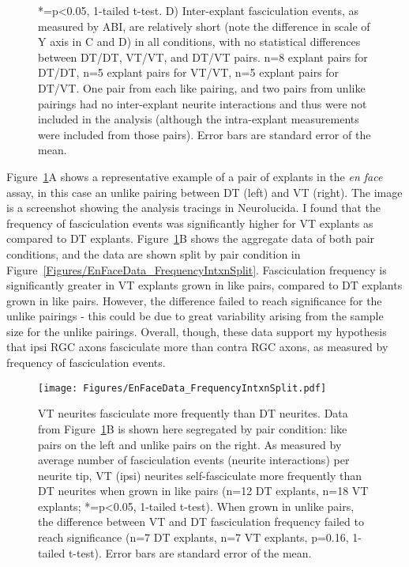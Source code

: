 \begin{figure}[hbtp]
\begin{center}
{        *=p<0.05, 1-tailed t-test.
        D) Inter-explant fasciculation events, as measured by ABI, are relatively short (note the difference in scale of Y axis in C and D) in all conditions, with no statistical differences between DT/DT, VT/VT, and DT/VT pairs.
        n=8 explant pairs for DT/DT, n=5 explant pairs for VT/VT, n=5 explant pairs for DT/VT.
        One pair from each like pairing, and two pairs from unlike pairings had no inter-explant neurite interactions and thus were not included in the analysis (although the intra-explant measurements were included from those pairs).
        Error bars are standard error of the mean.
        }
        \label{Figures/EnFaceData}
    \end{center}
\end{figure}

Figure~\ref{Figures/EnFaceData}A shows a representative example of a pair of explants in the \emph{en face} assay, in this case an unlike pairing between DT (left) and VT (right).
The image is a screenshot showing the analysis tracings in Neurolucida.
I found that the frequency of fasciculation events was significantly higher for VT explants as compared to DT explants.
Figure~\ref{Figures/EnFaceData}B shows the aggregate data of both pair conditions, and the data are shown split by pair condition in Figure~\ref{Figures/EnFaceData_FrequencyIntxnSplit}.
Fasciculation frequency is significantly greater in VT explants grown in like pairs, compared to DT explants grown in like pairs.
However, the difference failed to reach significance for the unlike pairings - this could be due to great variability arising from the sample size for the unlike pairings.
Overall, though, these data support my hypothesis that ipsi RGC axons fasciculate more than contra RGC axons, as measured by frequency of fasciculation events.
\begin{figure}[hbtp]
    \begin{center}
        \texttt{[image: Figures/EnFaceData\_FrequencyIntxnSplit.pdf]}
        \caption[VT neurites fasciculate more frequently than DT neurites.]
        {
        VT neurites fasciculate more frequently than DT neurites.
        Data from Figure~\ref{Figures/EnFaceData}B is shown here segregated by pair condition: like pairs on the left and unlike pairs on the right.
        As measured by average number of fasciculation events (neurite interactions) per neurite tip, VT (ipsi) neurites self-fasciculate more frequently than DT neurites when grown in like pairs (n=12 DT explants, n=18 VT explants; *=p<0.05, 1-tailed t-test).
        When grown in unlike pairs, the difference between VT and DT fasciculation frequency failed to reach significance (n=7 DT explants, n=7 VT explants, p=0.16, 1-tailed t-test).
        Error bars are standard error of the mean.
        }
        \label{Figures/EnFaceDataFrequencyIntxnSplit}
    \end{center}
\end{figure}

